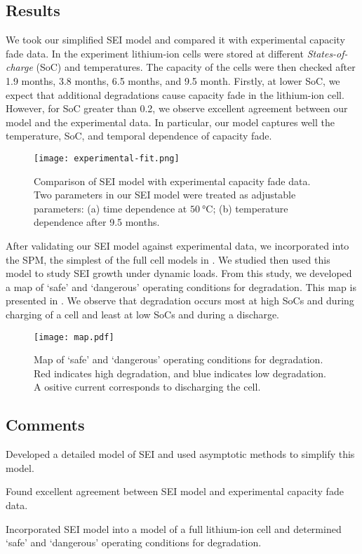 \documentclass[english,a4paper,oneside,9pt]{extarticle}
\begin{document}
\subsection{Results}
We took our simplified SEI model and compared it with experimental capacity fade data. In the experiment lithium-ion cells were stored at different \emph{States-of-charge} (SoC) and temperatures. The capacity of the cells were then checked after 1.9 months, 3.8 months, 6.5 months, and 9.5 month. Firstly, at lower SoC, we expect that additional degradations cause capacity fade in the lithium-ion cell. However, for SoC greater than 0.2, we observe excellent agreement between our model and the experimental data. In particular, our model captures well the temperature, SoC, and temporal dependence of capacity fade.

\begin{figure}[h]
	\centering
	\texttt{[image: experimental-fit.png]}
	\caption{Comparison of SEI model with experimental capacity fade data. Two parameters in our SEI model were treated as adjustable parameters: (a) time dependence at $\SI{50}{\celsius}$; (b) temperature dependence after 9.5 months.}
	\label{fig:sei}
\end{figure}

After validating our SEI model against experimental data, we incorporated into the SPM, the simplest of the full cell models in . We studied then used this model to study SEI growth under dynamic loads. From this study, we developed a map of `safe' and `dangerous' operating conditions for degradation. This map is presented in . We observe that degradation occurs most at high SoCs and during charging of a cell and least at low SoCs and during a discharge.

\begin{figure}[h]
	\centering
	\texttt{[image: map.pdf]}
	\caption{Map of `safe' and `dangerous' operating conditions for degradation. Red indicates high degradation, and blue indicates low degradation. A ositive current corresponds to discharging the cell.}
	\label{fig:degradation-map}
\end{figure}


\subsection{Comments}
\begin{infommitemize}
	\item Developed a detailed model of SEI and used asymptotic methods to simplify this model.
	\item Found excellent agreement between SEI model and experimental capacity fade data.
	\item Incorporated SEI model into a model of a full lithium-ion cell and determined `safe' and `dangerous' operating conditions for degradation.
\end{infommitemize}
\end{document}
